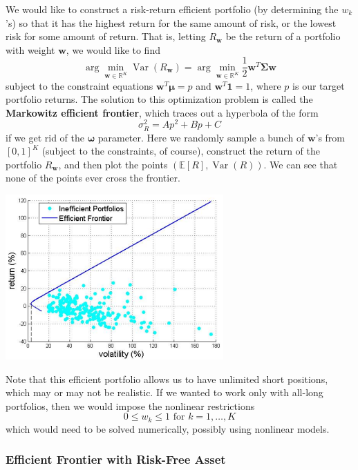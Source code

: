 \documentclass{article}
\DeclareMathOperator{\Var}{Var}
\begin{document}
      \begin{definition}
      We would like to construct a risk-return efficient portfolio (by determining the $w_k$'s) so that it has the highest return for the same amount of risk, or the lowest risk for some amount of return. That is, letting $R_{\mathbf{w}}$ be the return of a portfolio with weight $\mathbf{w}$, we would like to find 
      \[\arg \min_{\mathbf{w} \in \mathbb{R}^K} \Var(R_{\mathbf{w}}) = \arg \min_{\mathbf{w} \in \mathbb{R}^K} \frac{1}{2} \mathbf{w}^T \boldsymbol{\Sigma} \mathbf{w}\]
      subject to the constraint equations $\mathbf{w}^T \boldsymbol{\mu} = p$ and $\mathbf{w}^T \mathbf{1} = 1$, where $p$ is our target portfolio returns. The solution to this optimization problem is called the \textbf{Markowitz efficient frontier}, which traces out a hyperbola of the form 
      \[\sigma^2_R = A p^2 + B p + C\]
      if we get rid of the $\boldsymbol{\omega}$ parameter. Here we randomly sample a bunch of $\mathbf{w}$'s from $[0, 1]^K$ (subject to the constraints, of course), construct the return of the portfolio $R_{\mathbf{w}}$, and then plot the points $(\mathbb{E}[R], \Var(R))$. We can see that none of the points ever cross the frontier. 
      \begin{center}
          \includegraphics[scale=0.65]{img/Efficient_Frontier.png}
      \end{center}
      \end{definition}

      Note that this efficient portfolio allows us to have unlimited short positions, which may or may not be realistic. If we wanted to work only with all-long portfolios, then we would impose the nonlinear restrictions 
      \[0 \leq w_k \leq 1 \text{ for } k = 1, \ldots, K\]
      which would need to be solved numerically, possibly using nonlinear models. 

    \subsubsection{Efficient Frontier with Risk-Free Asset}
\end{document}
